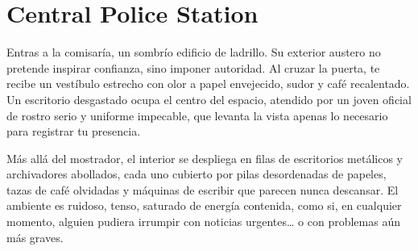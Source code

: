 \section{Central Police Station} 

Entras a la comisaría, un sombrío edificio de ladrillo. Su exterior austero no
pretende inspirar confianza, sino imponer autoridad. Al cruzar la puerta, te
recibe un vestíbulo estrecho con olor a papel envejecido, sudor y café
recalentado. Un escritorio desgastado ocupa el centro del espacio, atendido por
un joven oficial de rostro serio y uniforme impecable, que levanta la vista
apenas lo necesario para registrar tu presencia.

Más allá del mostrador, el interior se despliega en filas de escritorios
metálicos y archivadores abollados, cada uno cubierto por pilas desordenadas de
papeles, tazas de café olvidadas y máquinas de escribir que parecen nunca
descansar. El ambiente es ruidoso, tenso, saturado de energía contenida, como
si, en cualquier momento, alguien pudiera irrumpir con noticias urgentes… o con
problemas aún más graves.

